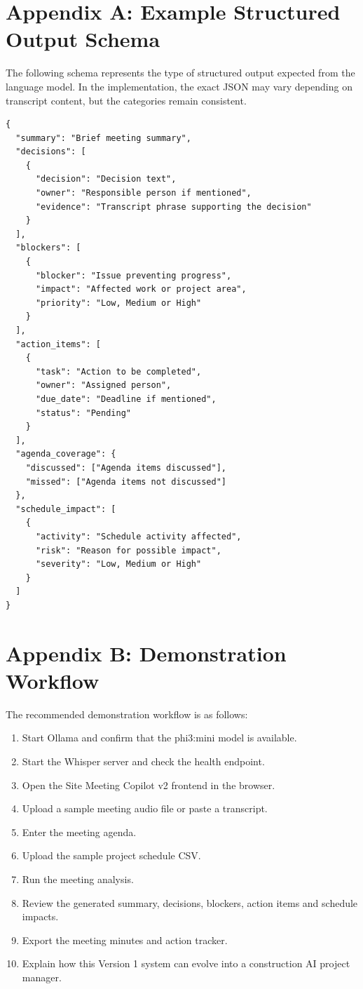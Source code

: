 \documentclass[11pt,a4paper]{article}
\begin{document}
\newpage

\section*{Appendix A: Example Structured Output Schema}

The following schema represents the type of structured output expected from the language model. In the implementation, the exact JSON may vary depending on transcript content, but the categories remain consistent.

\begin{verbatim}
{
  "summary": "Brief meeting summary",
  "decisions": [
    {
      "decision": "Decision text",
      "owner": "Responsible person if mentioned",
      "evidence": "Transcript phrase supporting the decision"
    }
  ],
  "blockers": [
    {
      "blocker": "Issue preventing progress",
      "impact": "Affected work or project area",
      "priority": "Low, Medium or High"
    }
  ],
  "action_items": [
    {
      "task": "Action to be completed",
      "owner": "Assigned person",
      "due_date": "Deadline if mentioned",
      "status": "Pending"
    }
  ],
  "agenda_coverage": {
    "discussed": ["Agenda items discussed"],
    "missed": ["Agenda items not discussed"]
  },
  "schedule_impact": [
    {
      "activity": "Schedule activity affected",
      "risk": "Reason for possible impact",
      "severity": "Low, Medium or High"
    }
  ]
}
\end{verbatim}

\section*{Appendix B: Demonstration Workflow}

The recommended demonstration workflow is as follows:

\begin{enumerate}[leftmargin=0.6cm]
    \item Start Ollama and confirm that the phi3:mini model is available.
    \item Start the Whisper server and check the health endpoint.
    \item Open the Site Meeting Copilot v2 frontend in the browser.
    \item Upload a sample meeting audio file or paste a transcript.
    \item Enter the meeting agenda.
    \item Upload the sample project schedule CSV.
    \item Run the meeting analysis.
    \item Review the generated summary, decisions, blockers, action items and schedule impacts.
    \item Export the meeting minutes and action tracker.
    \item Explain how this Version 1 system can evolve into a construction AI project manager.
\end{enumerate}
\end{document}
